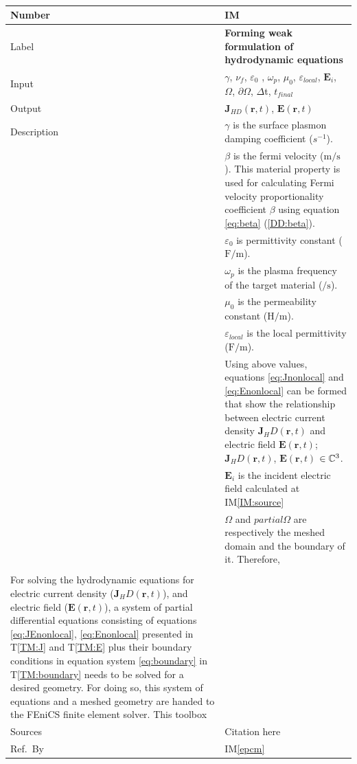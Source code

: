 \documentclass[12pt]{article}
\newcommand{\colAwidth}{0.13\textwidth}
\newcommand{\colBwidth}{0.82\textwidth}
\newcounter{instnum} %
\newcommand{\iref}[1]{IM\ref{#1}}
\begin{document}
~\newline
\noindent
\begin{minipage}{\textwidth}
	\renewcommand*{\arraystretch}{1.5}
	\begin{tabular}{| p{\colAwidth} | p{\colBwidth}|}
		\hline
		\rowcolor[gray]{0.9}
		Number& IM{instnum}\theinstnum \label{IM:solve}\\
		\hline
		Label& \bf Forming weak formulation of hydrodynamic equations\\
		\hline
		Input& $\gamma$, $\nu_f$, $\varepsilon_0$ , $\omega_p$, $\mu_{0}$, $\varepsilon_{local}$, $\textbf{E}_i$, $\Omega$, $\partial \Omega$, $\Delta$t, $t_{final}$
		\\
		\hline
		Output&  $\textbf{J}_{HD}(\textbf{r},t)$, $\textbf{E}(\textbf{r},t)$ \\
		\hline
		Description
		& $\gamma$ is the surface plasmon damping coefficient ($s^{-1}$).\\ 
		& $\beta$ is the fermi velocity ($\si{\meter \per \second}$). This material property is used for calculating Fermi velocity proportionality coefficient $\beta$ using equation \ref{eq:beta}  (\ref{DD:beta}).\\
		& $\varepsilon_{0}$ is permittivity constant ($\si{\farad \per \meter}$). \\
		& $\omega_p$ is the plasma frequency of the target material ($\si{\per \second}$).\\
		& $\mu_{0}$ is the permeability constant ($\si{\henry \per \meter}$). \\
		& $\varepsilon_{local}$ is the local permittivity ($\si{\farad \per \meter}$).\\
		& Using above values, equations \ref{eq:Jnonlocal} and \ref{eq:Enonlocal} can be formed that show the relationship between electric current density $\textbf{J}_HD(\textbf{r},t)$ and electric field $\textbf{E}(\textbf{r},t)$; $\textbf{J}_HD(\textbf{r},t)$, $\textbf{E}(\textbf{r},t)$ $\in \Bbb C^3$.\\
		
		& $\textbf{E}_i$ is the incident electric field calculated at IM\ref{IM:source} \\
		& $\Omega$ and $partial \Omega$ are respectively the meshed domain and the boundary of it. Therefore,    \\
		& \\       
		For solving the hydrodynamic equations for electric current density ($\textbf{J}_HD(\textbf{r},t)$), and electric field ($\textbf{E}(\textbf{r},t)$), a system of partial differential equations consisting of equations \ref{eq:JEnonlocal}, \ref{eq:Enonlocal} presented in T\ref{TM:J} and T\ref{TM:E} plus their boundary conditions in equation system \ref{eq:boundary} in T\ref{TM:boundary} needs to be solved for a desired geometry. For doing so, this system of equations and a meshed geometry are handed to the FEniCS finite element solver. This toolbox   
		\\
		\hline
		Sources& Citation here \\
		\hline
		Ref.\ By & \iref{epcm}\\
		\hline
	\end{tabular}
\end{minipage}\\
\end{document}
